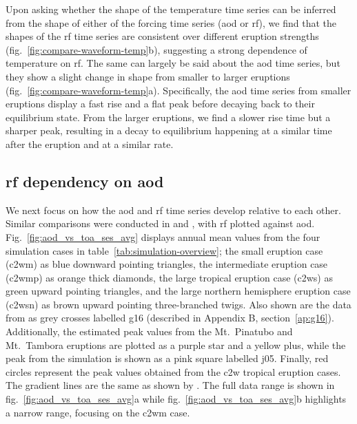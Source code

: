 \documentclass{ametsocV6.1}
\begin{document}
Upon asking whether the shape of the temperature time series can be inferred from the
shape of either of the forcing time series (\gls{aod} or \gls{rf}), we find that the
shapes of the \gls{rf} time series are consistent over different eruption strengths
(fig.~\ref{fig:compare-waveform-temp}b), suggesting a strong dependence of temperature
on \gls{rf}. The same can largely be said about the \gls{aod} time series, but they show
a slight change in shape from smaller to larger eruptions
(fig.~\ref{fig:compare-waveform-temp}a). Specifically, the \gls{aod} time series from
smaller eruptions display a fast rise and a flat peak before decaying back to their
equilibrium state. From the larger eruptions, we find a slower rise time but a sharper
peak, resulting in a decay to equilibrium happening at a similar time after the eruption
and at a similar rate.

\subsection{\gls{rf} dependency on \gls{aod}}

We next focus on how the \gls{aod} and \gls{rf} time series develop relative to each
other. Similar comparisons were conducted in \citet[][their Fig.\ 4]{gregory2016} and
\citet[][their Fig.\ 1]{marshall2020}, with \gls{rf} plotted against \gls{aod}.
Fig.~\ref{fig:aod_vs_toa_ses_avg} displays annual mean values from the four simulation
cases in table~\ref{tab:simulation-overview}; the small eruption case (\gls{c2wm}) as
blue downward pointing triangles, the intermediate eruption case (\gls{c2wmp}) as orange
thick diamonds, the large tropical eruption case (\gls{c2ws}) as green upward pointing
triangles, and the large northern hemisphere eruption case (\gls{c2wsn}) as brown upward
pointing three-branched twigs. Also shown are the data from \citet[][Fig.\ 4, black
  crosses from HadCM3 sstPiHistVol]{gregory2016} as grey crosses labelled \gls{g16}
(described in Appendix B, section~\ref{ap:g16}). Additionally, the estimated peak values
from the Mt.\ Pinatubo and Mt.\ Tambora eruptions are plotted as a purple star and a
yellow plus, while the peak from the \citet{jones2005} simulation is shown as a pink
square labelled \gls{j05}. Finally, red circles represent the peak values obtained from
the \gls{c2w} tropical eruption cases. The gradient lines are the same as shown by
\citet{gregory2016}. The full data range is shown in fig.~\ref{fig:aod_vs_toa_ses_avg}a
while fig.~\ref{fig:aod_vs_toa_ses_avg}b highlights a narrow range, focusing on the
\gls{c2wm} case.
\end{document}
